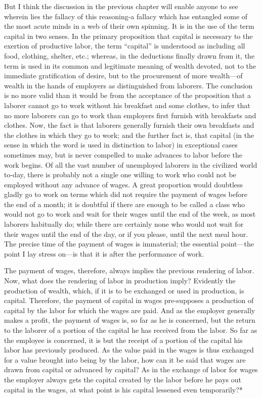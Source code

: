 But I think the discussion in the previous chapter will enable anyone to
see wherein lies the fallacy of this reasoning-a fallacy which has
entangled some of the most acute minds in a web of their own spinning.
It is in the use of the term capital in two senses. In the primary
proposition that capital is necessary to the exertion of productive
labor, the term ``capital'' is understood as including all food,
clothing, shelter, etc.; whereas, in the deductions finally drawn from
it, the term is used in its common and legitimate meaning of wealth
devoted, not to the immediate gratification of desire, but to the
procurement of more wealth---of wealth in the hands of employers as
distinguished from laborers. The conclusion is no more valid than it
would be from the acceptance of the proposition that a laborer cannot go
to work without his breakfast and some clothes, to infer that no more
laborers can go to work than employers first furnish with breakfasts and
clothes. Now, the fact is that laborers generally furnish their own
breakfasts and the clothes in which they go to work; and the further
fact is, that capital (in the sense in which the word is used in
distinction to labor) in exceptional cases sometimes may, but is never
compelled to make advances to labor before the work begins. Of all the
vast number of unemployed laborers in the civilized world to-day, there
is probably not a single one willing to work who could not be employed
without any advance of wages. A great proportion would doubtless gladly
go to work on terms which did not require the payment of wages before
the end of a month; it is doubtful if there are enough to be called a
class who would not go to work and wait for their wages until the end of
the week, as most laborers habitually do; while there are certainly none
who would not wait for their wages until the end of the day, or if you
please, until the next meal hour. The precise time of the payment of
wages is immaterial; the essential point---the point I lay stress
on---is that it is after the performance of work.

The payment of wages, therefore, always implies the previous rendering
of labor. Now, what does the rendering of labor in production imply?
Evidently the production of wealth, which, if it is to be exchanged or
used in production, is capital. Therefore, the payment of capital in
wages pre-supposes a production of capital by the labor for which the
wages are paid. And as the employer generally makes a profit, the
payment of wages is, so far as he is concerned, but the return to the
laborer of a portion of the capital he has received from the labor. So
far as the employee is concerned, it is but the receipt of a portion of
the capital his labor has previously produced. As the value paid in the
wages is thus exchanged for a value brought into being by the labor, how
can it be said that wages are drawn from capital or advanced by capital?
As in the exchange of labor for wages the employer always gets the
capital created by the labor before he pays out capital in the wages, at
what point is his capital lessened even temporarily?*

